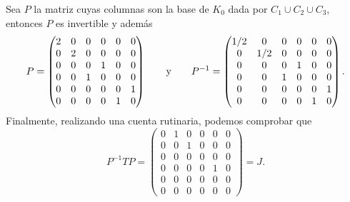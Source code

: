 \begin{example}
  Sea $P$ la matriz cuyas columnas son la base de $K_0$ dada por $C_1 \cup C_2 \cup C_3$, entonces $P$ es invertible y además
  \[
    P =  \begin{pmatrix}
      2 & 0 & 0 & 0 & 0 & 0 \\
      0 & 2 & 0 & 0 & 0 & 0 \\
      0 & 0 & 0 & 1 & 0 & 0 \\
      0 & 0 & 1 & 0 & 0 & 0 \\
      0 & 0 & 0 & 0 & 0 & 1 \\
      0 & 0 & 0 & 0 & 1 & 0
    \end{pmatrix}
    \qquad\text{y}\qquad
    P^{-1} =  \begin{pmatrix} 1/2 & 0 & 0 & 0 & 0 & 0 \\ 0 & 1/2 & 0 & 0 & 0 & 0 \\ 0 & 0 & 0 & 1 & 0 & 0 \\ 0 & 0 & 1 & 0 & 0 & 0 \\  0 & 0 & 0 & 0 & 0 & 1 \\ 0 & 0 & 0 & 0 & 1 & 0 \end{pmatrix}.
  \]
  Finalmente, realizando una cuenta rutinaria, podemos comprobar que
    \[
      P^{-1}TP 
        = \begin{pmatrix} 0 & 1 & 0 & 0 & 0 & 0 \\ 0 & 0 & 1 & 0 & 0 & 0 \\ 0 & 0 & 0 & 0 & 0 & 0 \\ 0 & 0 & 0 & 0 & 1 &0 \\ 0 & 0 & 0 & 0 & 0 & 0 \\ 0 & 0 & 0 & 0 & 0 & 0 \end{pmatrix} = J.
    \]
\end{example}

